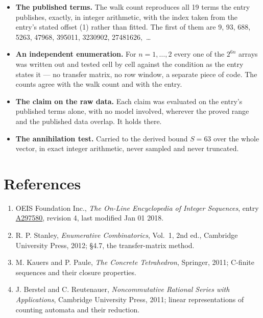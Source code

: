 \documentclass[11pt]{article}
\theoremstyle{definition}
\begin{document}
\begin{itemize}

\item {\bfseries The published terms.} The walk count reproduces all 19 terms the entry publishes, exactly, in integer arithmetic, with the index taken from the entry's stated offset (1) rather than fitted. The first of them are 9, 93, 688, 5263, 47968, 395011, 3230902, 27481626,~\dots

\item {\bfseries An independent enumeration.} For $n = 1,\dots,2$ every one of the $2^{6n}$ arrays was written out and tested cell by cell against the condition as the entry states it --- no transfer matrix, no row window, a separate piece of code. The counts agree with the walk count and with the entry.

\item {\bfseries The claim on the raw data.} Each claim was evaluated on the entry's published terms alone, with no model involved, wherever the proved range and the published data overlap. It holds there.

\item {\bfseries The annihilation test.} Carried to the derived bound $S = 63$ over the whole vector, in exact integer arithmetic, never sampled and never truncated.

\end{itemize}

\section{References}

\begin{enumerate}

\item OEIS Foundation Inc., \emph{The On-Line Encyclopedia of Integer Sequences}, entry \href{https://oeis.org/A297580}{A297580}, revision 4, last modified Jan 01 2018.

\item R. P. Stanley, \emph{Enumerative Combinatorics}, Vol.~1, 2nd ed., Cambridge University Press, 2012; \S4.7, the transfer-matrix method.

\item M. Kauers and P. Paule, \emph{The Concrete Tetrahedron}, Springer, 2011; C-finite sequences and their closure properties.

\item J. Berstel and C. Reutenauer, \emph{Noncommutative Rational Series with Applications}, Cambridge University Press, 2011; linear representations of counting automata and their reduction.

\end{enumerate}
\end{document}
